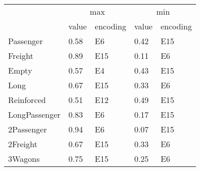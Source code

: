 \begin{tabular}{lllll}
\toprule
 & \multicolumn{2}{c}{max} & \multicolumn{2}{c}{min} \\
 & value & encoding & value & encoding \\
\midrule
Passenger & 0.58 & E6 & 0.42 & E15 \\
Freight & 0.89 & E15 & 0.11 & E6 \\
Empty & 0.57 & E4 & 0.43 & E15 \\
Long & 0.67 & E15 & 0.33 & E6 \\
Reinforced & 0.51 & E12 & 0.49 & E15 \\
LongPassenger & 0.83 & E6 & 0.17 & E15 \\
2Passenger & 0.94 & E6 & 0.07 & E15 \\
2Freight & 0.67 & E15 & 0.33 & E6 \\
3Wagons & 0.75 & E15 & 0.25 & E6 \\
\bottomrule
\end{tabular}
